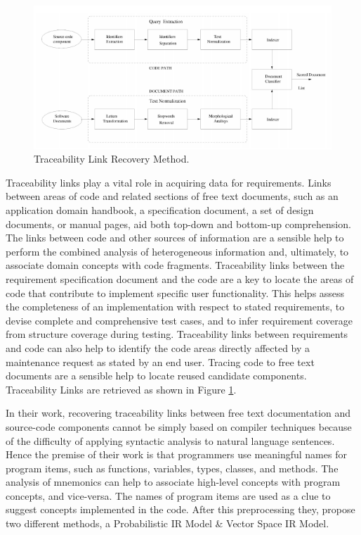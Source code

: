 \documentclass{report}
\begin{document}
\begin{figure}[!ht]
\begin{minipage}{\linewidth}
\centering
\includegraphics[scale=0.75]{img/traceability-links}
\caption{Traceability Link Recovery Method.}
\label{fig:traceLinks}
\end{minipage}
\end{figure}

Traceability links play a vital role in acquiring data for requirements. Links
between areas of code and related sections of free text documents, such as an
application domain handbook, a specification document, a set of design documents, or manual pages, 
aid both top-down and bottom-up comprehension. The links between code and other sources of
information are a sensible help to perform the combined analysis of heterogeneous information and,
ultimately, to associate domain concepts with code fragments. Traceability links between the
requirement specification document and the code are a key to locate the areas of code that contribute
to implement specific user functionality. This helps assess the completeness of an implementation with
respect to stated requirements, to devise complete and comprehensive test cases, and to infer
requirement coverage from structure coverage during testing. Traceability links between requirements
and code can also help to identify the code areas directly affected by a maintenance request as stated
by an end user. Tracing code to free text documents are a sensible help to locate reused candidate
components. Traceability Links are retrieved as shown in Figure \ref{fig:traceLinks}.

In their work, recovering traceability links between free text documentation and
source-code components cannot be simply based on compiler techniques because of the
difficulty of applying syntactic analysis to natural language sentences. Hence the
premise of their work is that programmers use meaningful names for program items,
such as functions, variables, types, classes, and methods. The analysis of mnemonics
can help to associate high-level concepts with program concepts, and vice-versa. The
names of program items are used as a clue to suggest concepts implemented in the
code. After this preprocessing they, propose two different methods, a
Probabilistic IR Model \& Vector Space IR Model.
\end{document}
